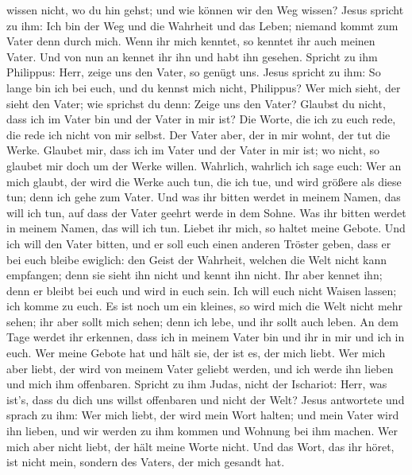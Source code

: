 wissen nicht, wo du hin gehst; und wie können wir den Weg wissen?
 Jesus spricht zu ihm: Ich bin der Weg und die Wahrheit und
das Leben; niemand kommt zum Vater denn durch mich.  Wenn
ihr mich kenntet, so kenntet ihr auch meinen Vater. Und von nun an
kennet ihr ihn und habt ihn gesehen.  Spricht zu ihm
Philippus: Herr, zeige uns den Vater, so genügt uns.  Jesus
spricht zu ihm: So lange bin ich bei euch, und du kennst mich nicht,
Philippus? Wer mich sieht, der sieht den Vater; wie sprichst du denn:
Zeige uns den Vater?  Glaubst du nicht, dass ich im Vater
bin und der Vater in mir ist? Die Worte, die ich zu euch rede, die rede
ich nicht von mir selbst. Der Vater aber, der in mir wohnt, der tut die
Werke.  Glaubet mir, dass ich im Vater und der Vater in mir
ist; wo nicht, so glaubet mir doch um der Werke willen. 
Wahrlich, wahrlich ich sage euch: Wer an mich glaubt, der wird die Werke
auch tun, die ich tue, und wird größere als diese tun; denn ich gehe zum
Vater.  Und was ihr bitten werdet in meinem Namen, das will
ich tun, auf dass der Vater geehrt werde in dem Sohne.  Was
ihr bitten werdet in meinem Namen, das will ich tun. 
Liebet ihr mich, so haltet meine Gebote.  Und ich will den
Vater bitten, und er soll euch einen anderen Tröster geben, dass er bei
euch bleibe ewiglich:  den Geist der Wahrheit, welchen die
Welt nicht kann empfangen; denn sie sieht ihn nicht und kennt ihn nicht.
Ihr aber kennet ihn; denn er bleibt bei euch und wird in euch sein.
 Ich will euch nicht Waisen lassen; ich komme zu euch.
 Es ist noch um ein kleines, so wird mich die Welt nicht
mehr sehen; ihr aber sollt mich sehen; denn ich lebe, und ihr sollt auch
leben.  An dem Tage werdet ihr erkennen, dass ich in meinem
Vater bin und ihr in mir und ich in euch.  Wer meine Gebote
hat und hält sie, der ist es, der mich liebt. Wer mich aber liebt, der
wird von meinem Vater geliebt werden, und ich werde ihn lieben und mich
ihm offenbaren.  Spricht zu ihm Judas, nicht der Ischariot:
Herr, was ist's, dass du dich uns willst offenbaren und nicht der Welt?
 Jesus antwortete und sprach zu ihm: Wer mich liebt, der
wird mein Wort halten; und mein Vater wird ihn lieben, und wir werden zu
ihm kommen und Wohnung bei ihm machen.  Wer mich aber nicht
liebt, der hält meine Worte nicht. Und das Wort, das ihr höret, ist
nicht mein, sondern des Vaters, der mich gesandt hat. 
